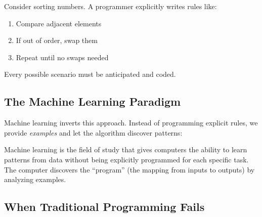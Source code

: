 \begin{examplebox}
Consider sorting numbers. A programmer explicitly writes rules like:
\begin{enumerate}
    \item Compare adjacent elements
    \item If out of order, swap them
    \item Repeat until no swaps needed
\end{enumerate}
Every possible scenario must be anticipated and coded.
\end{examplebox}

\subsection{The Machine Learning Paradigm}

Machine learning inverts this approach. Instead of programming explicit rules, we provide \textit{examples} and let the algorithm discover patterns:

\begin{center}
\end{center}

\begin{definitionbox}
Machine learning is the field of study that gives computers the ability to learn patterns from data without being explicitly programmed for each specific task. The computer discovers the ``program'' (the mapping from inputs to outputs) by analyzing examples.
\end{definitionbox}

\subsection{When Traditional Programming Fails}

